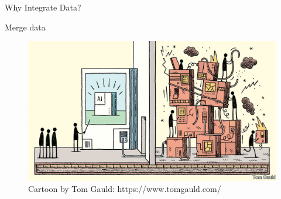 \documentclass[
  ignorenonframetext,
]{beamer}
\begin{document}
\begin{frame}{Why Integrate Data?}
\begin{block}{Merge data}
\label{merge-data}
\begin{figure}[H]

{\centering \includegraphics{Images/TomGaiuuldAI.jpg}

}

\caption{Cartoon by Tom Gauld: https://www.tomgauld.com/}

\end{figure}%
\end{block}
\end{frame}
\end{document}
